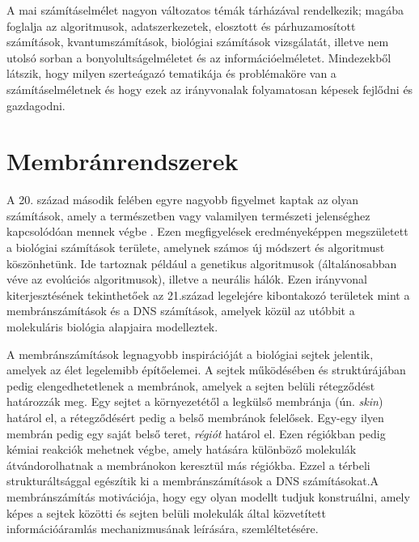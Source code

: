

A mai számításelmélet nagyon változatos témák tárházával rendelkezik; 
magába foglalja az algoritmusok, adatszerkezetek, elosztott és párhuzamosított számítások, kvantumszámítások, biológiai számítások vizsgálatát, illetve nem utolsó sorban a bonyolultságelméletet és az információelméletet.
Mindezekből látszik, hogy milyen szerteágazó tematikája és problémaköre van a számításelméletnek és hogy ezek az irányvonalak folyamatosan képesek fejlődni és gazdagodni.

\section{Membránrendszerek}

A 20. század második felében egyre nagyobb figyelmet kaptak az olyan számítások, amely a természetben vagy valamilyen természeti jelenséghez kapcsolódóan mennek végbe \cite{paun2002membrane}. Ezen megfigyelések eredményeképpen megszületett a biológiai számítások területe, amelynek számos új módszert és algoritmust köszönhetünk. Ide tartoznak például a genetikus algoritmusok (általánosabban véve az evolúciós algoritmusok), illetve a neurális hálók. Ezen irányvonal kiterjesztésének tekinthetőek az 21.század legelejére kibontakozó területek mint a membránszámítások és a DNS számítások, amelyek közül az utóbbit a molekuláris biológia alapjaira modelleztek.

A membránszámítások legnagyobb inspirációját a biológiai sejtek jelentik, amelyek az élet legelemibb építőelemei. A sejtek működésében és struktúrájában pedig elengedhetetlenek a membránok, amelyek a sejten belüli rétegződést határozzák meg. Egy sejtet a környezetétől a legkülső membránja (ún. \textit{skin}) határol el, a rétegződésért pedig a belső membránok felelősek.  Egy-egy ilyen membrán pedig egy saját belső teret, \textit{régiót} határol el.
Ezen régiókban pedig kémiai reakciók mehetnek végbe, amely hatására különböző molekulák átvándorolhatnak a membránokon keresztül más régiókba. Ezzel a térbeli strukturáltsággal egészítik ki a membránszámítások a DNS számításokat.A  membránszámítás motivációja, hogy egy olyan modellt tudjuk konstruálni, amely képes a sejtek közötti és sejten belüli molekulák által közvetített információáramlás mechanizmusának leírására, szemléltetésére.

